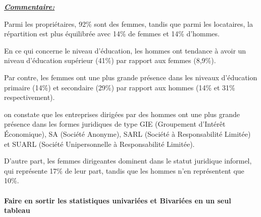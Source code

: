 \documentclass[
]{article}
\begin{document}
\renewcommand*{\arraystretch}{1}

\hfill\break

\ul{\textbf{\emph{Commentaire:}}}~

Parmi les propriétaires, 92\% sont des femmes, tandis que parmi les
locataires, la répartition est plus équilibrée avec 14\% de femmes et
14\% d'hommes.

En ce qui concerne le niveau d'éducation, les hommes ont tendance à
avoir un niveau d'éducation supérieur (41\%) par rapport aux femmes
(8,9\%).

Par contre, les femmes ont une plus grande présence dans les niveaux
d'éducation primaire (14\%) et secondaire (29\%) par rapport aux hommes
(14\% et 31\% respectivement).

on constate que les entreprises dirigées par des hommes ont une plus
grande présence dans les formes juridiques de type GIE (Groupement
d'Intérêt Économique), SA (Société Anonyme), SARL (Société à
Responsabilité Limitée) et SUARL (Société Unipersonnelle à
Responsabilité Limitée).

D'autre part, les femmes dirigeantes dominent dans le statut juridique
informel, qui représente 17\% de leur part, tandis que les hommes n'en
représentent que 10\%.

\hfill\break

\hypertarget{faire-en-sortir-les-statistiques-univariuxe9es-et-bivariuxe9es-en-un-seul-tableau}{%
\paragraph{Faire en sortir les statistiques univariées et Bivariées en
un seul
tableau}\label{faire-en-sortir-les-statistiques-univariuxe9es-et-bivariuxe9es-en-un-seul-tableau}}

\hfill\break
\end{document}
